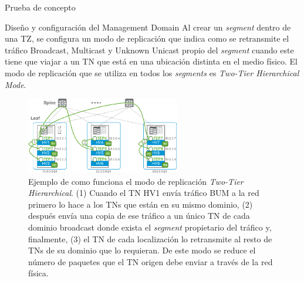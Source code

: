 \begin{section}{Prueba de concepto}
\begin{subsection}{Diseño y configuración del Management Domain}
    Al crear un \textit{segment} dentro de una TZ, se configura un modo de replicación que indica como se retransmite el tráfico Broadcast, Multicast y Unknown Unicast propio del \textit{segment} cuando este tiene que viajar a un TN que está en una ubicación distinta en el medio físico. El modo de replicación que se utiliza en todos los \textit{segments} es \textit{Two-Tier Hierarchical Mode}. 
    \begin{figure}[h]
      \centering
      \includegraphics[width=0.6\textwidth]{imaxes/pruebaconcepto/Two-tier-ReplicationMode.png}
      \caption{Ejemplo de como funciona el modo de replicación \textit{Two-Tier Hierarchical}. (1) Cuando el TN HV1 envía tráfico BUM a la red primero lo hace a los TNs que están en su mismo dominio, (2) después envía una copia de ese tráfico a un único TN de cada dominio broadcast donde exista el \textit{segment} propietario del tráfico y, finalmente, (3) el TN de cada localización lo retransmite al resto de TNs de su dominio que lo requieran. De este modo se reduce el número de paquetes que el TN origen debe enviar a través de la red física.}
      \label{fig:Frame-Geneve-Segment-NSXT}
    \end{figure}
    \FloatBarrier
    

\end{subsection}
\end{section}
